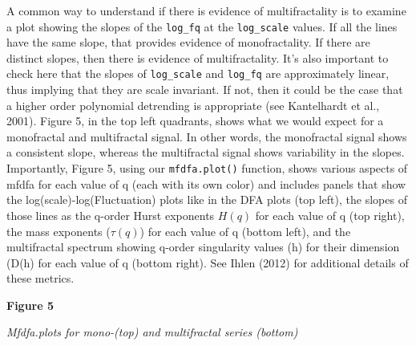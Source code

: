 \documentclass[
  man]{apa6}
\begin{document}
A common way to understand if there is evidence of multifractality is to
examine a plot showing the slopes of the \texttt{log\_fq} at the \texttt{log\_scale}
values. If all the lines have the same slope, that provides evidence of
monofractality. If there are distinct slopes, then there is evidence of
multifractality. It's also important to check here that the slopes of
\texttt{log\_scale} and \texttt{log\_fq} are approximately linear, thus implying that
they are scale invariant. If not, then it could be the case that a
higher order polynomial detrending is appropriate (see Kantelhardt et
al., 2001). Figure 5, in the top left quadrants, shows what we would
expect for a monofractal and multifractal signal. In other words, the
monofractal signal shows a consistent slope, whereas the multifractal
signal shows variability in the slopes. Importantly, Figure 5, using our
\texttt{mfdfa.plot()} function, shows various aspects of mfdfa for each value
of q (each with its own color) and includes panels that show the
log(scale)-log(Fluctuation) plots like in the DFA plots (top left), the
slopes of those lines as the q-order Hurst exponents \(H(q)\) for each
value of q (top right), the mass exponents (\(\tau(q)\)) for each value of
q (bottom left), and the multifractal spectrum showing q-order
singularity values (h) for their dimension (D(h) for each value of q
(bottom right). See Ihlen (2012) for additional details of these
metrics.

\textbf{Figure 5}

\emph{Mfdfa.plots for mono-(top) and multifractal series (bottom)}
\end{document}
